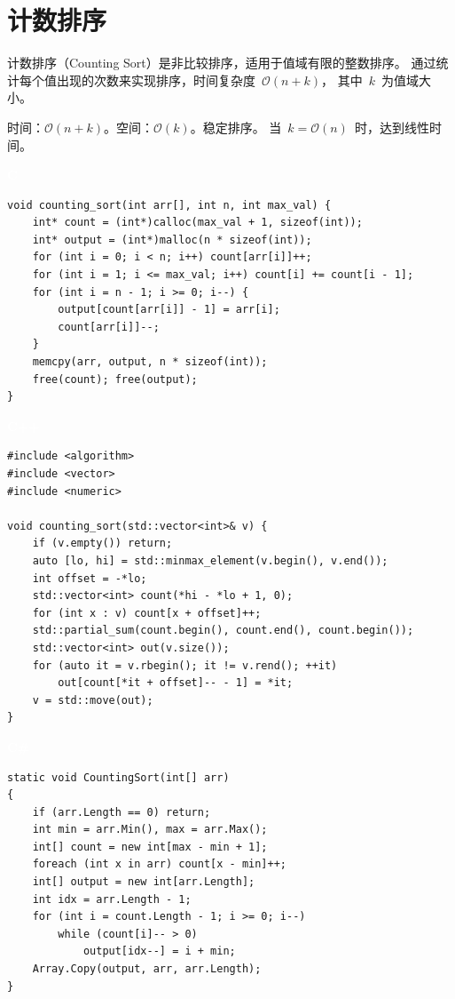 \documentclass[12pt,a4paper,fontset=fandol]{ctexbook}
\newcommand{\clabel}{%
  \noindent\begin{tcolorbox}[sharp corners,colback=cheadbg,colframe=cheadbg,
    left=6pt,right=6pt,top=2pt,bottom=2pt,boxrule=0pt]
  \textcolor{white}{\small\bfseries\sffamily C}\end{tcolorbox}%
}
\newcommand{\cpplabel}{%
  \noindent\begin{tcolorbox}[sharp corners,colback=cppheadbg,colframe=cppheadbg,
    left=6pt,right=6pt,top=2pt,bottom=2pt,boxrule=0pt]
  \textcolor{white}{\small\bfseries\sffamily C++}\end{tcolorbox}%
}
\newcommand{\csharplabel}{%
  \noindent\begin{tcolorbox}[sharp corners,colback=csharpheadbg,colframe=csharpheadbg,
    left=6pt,right=6pt,top=2pt,bottom=2pt,boxrule=0pt]
  \textcolor{white}{\small\bfseries\sffamily C\#}\end{tcolorbox}%
}
\newcommand{\bigO}[1]{\mathcal{O}(#1)}
\begin{document}
\chapter{计数排序}

计数排序（Counting Sort）是非比较排序，适用于值域有限的整数排序。
通过统计每个值出现的次数来实现排序，时间复杂度~$\bigO{n + k}$，
其中~$k$~为值域大小。

\begin{complexitybox}
  时间：$\bigO{n + k}$。空间：$\bigO{k}$。稳定排序。
  当~$k = \bigO{n}$~时，达到线性时间。
\end{complexitybox}

\clabel
\begin{lstlisting}[style=cstyle]
void counting_sort(int arr[], int n, int max_val) {
    int* count = (int*)calloc(max_val + 1, sizeof(int));
    int* output = (int*)malloc(n * sizeof(int));
    for (int i = 0; i < n; i++) count[arr[i]]++;
    for (int i = 1; i <= max_val; i++) count[i] += count[i - 1];
    for (int i = n - 1; i >= 0; i--) {
        output[count[arr[i]] - 1] = arr[i];
        count[arr[i]]--;
    }
    memcpy(arr, output, n * sizeof(int));
    free(count); free(output);
}
\end{lstlisting}

\cpplabel
\begin{lstlisting}[style=cppstyle]
#include <algorithm>
#include <vector>
#include <numeric>

void counting_sort(std::vector<int>& v) {
    if (v.empty()) return;
    auto [lo, hi] = std::minmax_element(v.begin(), v.end());
    int offset = -*lo;
    std::vector<int> count(*hi - *lo + 1, 0);
    for (int x : v) count[x + offset]++;
    std::partial_sum(count.begin(), count.end(), count.begin());
    std::vector<int> out(v.size());
    for (auto it = v.rbegin(); it != v.rend(); ++it)
        out[count[*it + offset]-- - 1] = *it;
    v = std::move(out);
}
\end{lstlisting}

\csharplabel
\begin{lstlisting}[style=csharpstyle]
static void CountingSort(int[] arr)
{
    if (arr.Length == 0) return;
    int min = arr.Min(), max = arr.Max();
    int[] count = new int[max - min + 1];
    foreach (int x in arr) count[x - min]++;
    int[] output = new int[arr.Length];
    int idx = arr.Length - 1;
    for (int i = count.Length - 1; i >= 0; i--)
        while (count[i]-- > 0)
            output[idx--] = i + min;
    Array.Copy(output, arr, arr.Length);
}
\end{lstlisting}
\end{document}
